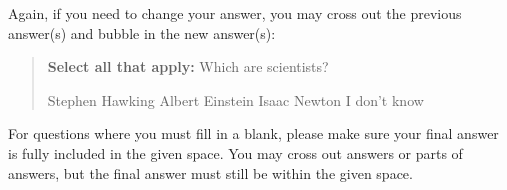\documentclass[11pt,addpoints,answers]{exam}
\begin{document}
Again, if you need to change your answer, you may cross out the previous answer(s) and bubble in the new answer(s):

\begin{quote}
\textbf{Select all that apply:} Which are scientists?
    {%
    \checkboxchar{\xcancel{$\blacksquare$}} \checkedchar{$\blacksquare$} %
    \begin{checkboxes}
    \CorrectChoice Stephen Hawking 
    \CorrectChoice Albert Einstein
    \CorrectChoice Isaac Newton
    \choice I don't know
    \end{checkboxes}
    }
\end{quote}

For questions where you must fill in a blank, please make sure your final answer is fully included in the given space. You may cross out answers or parts of answers, but the final answer must still be within the given space.
\end{document}
